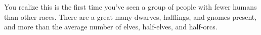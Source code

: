\begin{multicols}{2}
\begin{aloud}
  You realize this is the first time you've seen a group of people with fewer humans than other races.
  There are a great many dwarves, halflings, and gnomes present, and more than the average number of elves, half-elves, and half-orcs.

  \end{aloud}

\end{multicols}